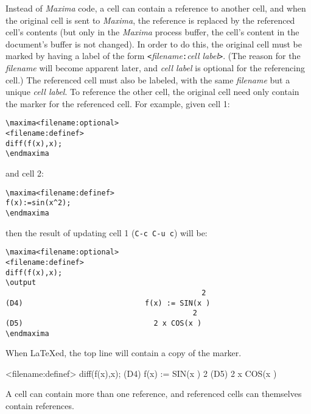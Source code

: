 \documentclass{article}
\newcommand{\mx}{\textsl{\sffamily Maxima}}
\begin{document}
\noindent
Instead of \mx{} code, a cell can contain a reference to another cell,
and when the original cell is sent to \mx{}, the reference is replaced
by the referenced cell's contents (but only in the \mx{} process
buffer, the cell's 
content in the document's buffer is not changed).  In order to do
this, the original cell must be marked by having a label of the form
\texttt{<}\textsl{filename}\texttt{:}\textsl{cell label}\texttt{>}.
(The reason for the \textsl{filename} will become apparent later, and
\textsl{cell label} is optional for the referencing cell.)
The referenced cell must also be labeled, with the same
\textsl{filename} but a unique \textsl{cell label}.  To reference the
other cell, the original cell need only contain the marker for the
referenced cell.  For example, given cell 1:
\begin{verbatim}
\maxima<filename:optional>
<filename:definef>
diff(f(x),x);
\endmaxima
\end{verbatim}
\noindent
and cell 2:
\begin{verbatim}
\maxima<filename:definef>
f(x):=sin(x^2);
\endmaxima
\end{verbatim}
\noindent
then the result of updating cell 1 (\texttt{C-c C-u c}) will be:
\begin{verbatim}
\maxima<filename:optional>
<filename:definef>
diff(f(x),x);
\output
                                             2
(D4)                            f(x) := SIN(x )
                                           2
(D5)                              2 x COS(x )
\endmaxima
\end{verbatim}
\noindent
When \LaTeX{}ed, the top line will contain a copy of the marker.

\newpage

<filename:definef>
diff(f(x),x);
(D4)                            f(x) := SIN(x )
                                           2
(D5)                              2 x COS(x )
\endmaxima

A cell can contain more than one reference, and referenced cells can
themselves contain references.  
\end{document}

